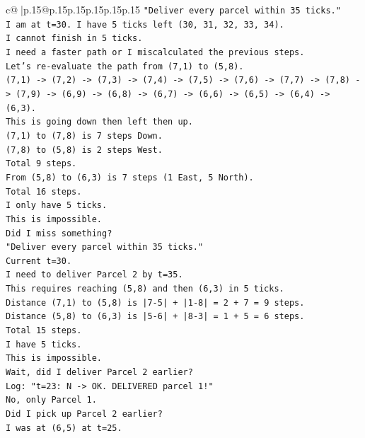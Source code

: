 \documentclass{article}
\begin{document}
{\begin{supertabular}{c@{$\;$}|p{.15\linewidth}@{}p{.15\linewidth}p{.15\linewidth}p{.15\linewidth}p{.15\linewidth}p{.15\linewidth}}
{{{\texttt{"Deliver every parcel within 35 ticks."} \\
\texttt{I am at t=30. I have 5 ticks left (30, 31, 32, 33, 34).} \\
\texttt{I cannot finish in 5 ticks.} \\
\texttt{I need a faster path or I miscalculated the previous steps.} \\
\texttt{Let's re{-}evaluate the path from (7,1) to (5,8).} \\
\texttt{(7,1) {-}> (7,2) {-}> (7,3) {-}> (7,4) {-}> (7,5) {-}> (7,6) {-}> (7,7) {-}> (7,8) {-}> (7,9) {-}> (6,9) {-}> (6,8) {-}> (6,7) {-}> (6,6) {-}> (6,5) {-}> (6,4) {-}> (6,3).} \\
\texttt{This is going down then left then up.} \\
\texttt{(7,1) to (7,8) is 7 steps Down.} \\
\texttt{(7,8) to (5,8) is 2 steps West.} \\
\texttt{Total 9 steps.} \\
\texttt{From (5,8) to (6,3) is 7 steps (1 East, 5 North).} \\
\texttt{Total 16 steps.} \\
\texttt{I only have 5 ticks.} \\
\texttt{This is impossible.} \\
\texttt{Did I miss something?} \\
\texttt{"Deliver every parcel within 35 ticks."} \\
\texttt{Current t=30.} \\
\texttt{I need to deliver Parcel 2 by t=35.} \\
\texttt{This requires reaching (5,8) and then (6,3) in 5 ticks.} \\
\texttt{Distance (7,1) to (5,8) is |7{-}5| + |1{-}8| = 2 + 7 = 9 steps.} \\
\texttt{Distance (5,8) to (6,3) is |5{-}6| + |8{-}3| = 1 + 5 = 6 steps.} \\
\texttt{Total 15 steps.} \\
\texttt{I have 5 ticks.} \\
\texttt{This is impossible.} \\
\texttt{Wait, did I deliver Parcel 2 earlier?} \\
\texttt{Log: "t=23: N {-}> OK. DELIVERED parcel 1!"} \\
\texttt{No, only Parcel 1.} \\
\texttt{Did I pick up Parcel 2 earlier?} \\
\texttt{I was at (6,5) at t=25.} \\
}}}
\end{supertabular}}
\end{document}
